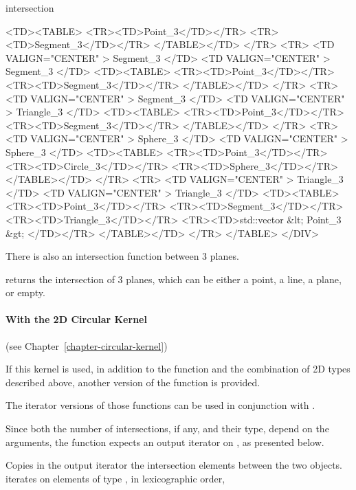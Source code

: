 \begin{ccRefFunction}{intersection}
\begin{ccHtmlOnly}
    <TD><TABLE>
	<TR><TD>Point_3</TD></TR>
	<TR><TD>Segment_3</TD></TR>
        </TABLE></TD>
</TR>
<TR>
    <TD VALIGN="CENTER" > Segment_3 </TD>
    <TD VALIGN="CENTER" > Segment_3 </TD>
    <TD><TABLE>
	<TR><TD>Point_3</TD></TR>
	<TR><TD>Segment_3</TD></TR>
        </TABLE></TD>
</TR>
<TR>
    <TD VALIGN="CENTER" > Segment_3 </TD>
    <TD VALIGN="CENTER" > Triangle_3 </TD>
    <TD><TABLE>
	<TR><TD>Point_3</TD></TR>
	<TR><TD>Segment_3</TD></TR>
        </TABLE></TD>
</TR>
<TR>
    <TD VALIGN="CENTER" > Sphere_3 </TD>
    <TD VALIGN="CENTER" > Sphere_3 </TD>
    <TD><TABLE>
	<TR><TD>Point_3</TD></TR>
	<TR><TD>Circle_3</TD></TR>
	<TR><TD>Sphere_3</TD></TR>
        </TABLE></TD>
</TR>
<TR>
    <TD VALIGN="CENTER" > Triangle_3 </TD>
    <TD VALIGN="CENTER" > Triangle_3 </TD>
    <TD><TABLE>
	<TR><TD>Point_3</TD></TR>
	<TR><TD>Segment_3</TD></TR>
	<TR><TD>Triangle_3</TD></TR>
	<TR><TD>std::vector &lt; Point_3  &gt; </TD></TR>
        </TABLE></TD>
</TR>
</TABLE>
</DIV>
\end{ccHtmlOnly}

There is also an intersection function between 3 planes.

{returns the intersection of 3 planes, which can be either a point, a line,
a plane, or empty.}

\paragraph{With the 2D Circular Kernel} (see Chapter~\ref{chapter-circular-kernel}) 


If this kernel is used, in addition to the function and the
combination of 2D types described above, another version of the function
is provided.

The iterator versions of those functions can be used in conjunction
with .

Since both the number of intersections, if any, and their type,
depend on the arguments, the function expects an output
iterator on , as presented below. 

{Copies in the output iterator the intersection elements between the
two objects.  iterates on
elements of type , in lexicographic order,}


\end{ccRefFunction}
